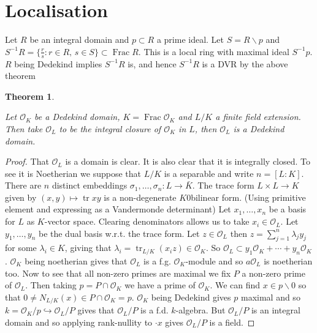 \documentclass[10pt,]{book}
\theoremstyle{plain}
\newtheorem{theorem}{Theorem}[section]
\theoremstyle{definition}
\newcommand{\cO}{\mathcal{O}}
\DeclareMathOperator{\tr}{tr}
\DeclareMathOperator{\Frac}{Frac}
\begin{document}
\section[Localisation]{Localisation}\label{sec-localisation}
Let \(R\) be an integral domain and \(p \subset R\) a prime ideal.
          Let \(S = R\smallsetminus p\) and \(S^{-1}R = \{\frac{r}{s} : r\in R,\, s\in S\}\subset\Frac R\).
          This is a local ring with maximal ideal \(S^{-1}p\).
          \(R\) being Dedekind implies \(S^{-1}R\) is, and hence \(S^{-1}R\) is a DVR by the above theorem 
\begin{theorem}\label{theorem-5}

            Let \(\cO_K\) be a Dedekind domain, \(K = \Frac \cO_K\) and \(L/K\) a finite field extension.
            Then take \(\cO_L\) to be the integral closure of \(\cO_K\) in \(L\), then \(\cO_L\) is a Dedekind domain.
          \end{theorem}
\begin{proof}

            That \(\cO_L\) is a domain is clear.\newline{}
            It is also clear that it is integrally closed.\newline{}
            To see it is Noetherian we suppose that \(L/K\) is a separable and write \(n = [L:K]\).
            There are \(n\) distinct embeddings \(\sigma_1,\ldots,\sigma_n\colon L \to \bar K\).
            The trace form \(L\times L \to K\) given by \((x,y)\mapsto \tr xy\) is a non-degenerate \(K\)0bilinear form.
            (Using primitive element and expressing as a Vandermonde determinant)
            Let \(x_1,\ldots,x_n\) be a basis for \(L\) as  \(K\)-vector space.
            Clearing denominators allows us to take \(x_i \in \cO_L\).
            Let \(y_1,\ldots,y_n\) be the dual basis w.r.t. the trace form.
            Let \(z\in \cO_L\) then \(z = \sum_{j =1}^{n}\lambda_j y_j\) for some \(\lambda_i \in K\), giving that \(\lambda_i = \tr_{L/K}(x_i z)\in \cO_K\).
            So \(\cO_L \subset y_1\cO_K + \cdots + y_n \cO_K\).
            \(\cO_K\) being noetherian gives that \(\cO_L\) is a f.g. \(\cO_K\)-module and so \(a\cO_L\) is noetherian too.\newline{}
            Now to see that all non-zero primes are maximal we fix \(P\) a non-zero prime of \(\cO_L\).
            Then taking \(p = P \cap \cO_K\) we have a prime of \(\cO_K\).
            We can find \(x \in p \smallsetminus 0\) so that \(0 \ne N_{L/K} (x) \in P \cap \cO_K = p\).
            \(\cO_K\) being Dedekind gives \(p\) maximal and so \(k = \cO_K/p \hookrightarrow \cO_L/P\) gives that \(\cO_L/P\) is a f.d. \(k\)-algebra.
            But \(\cO_L/P\) is an integral domain and so applying rank-nullity to \(\cdot x\) gives \(\cO_L/P\) is a field.
          \end{proof}
\end{document}
